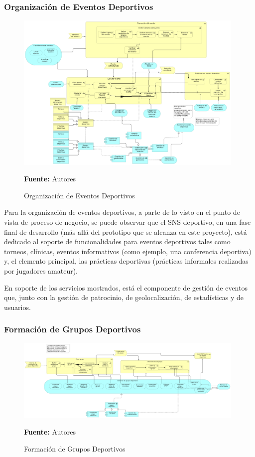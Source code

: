 \subsubsection{Organización de Eventos Deportivos}

\begin{figure}[!htb]
  \begin{center}
    \includegraphics[width=11cm]{./imagenes/application_usage/organizacioneventosdeportivos.png}
    \caption{Organización de Eventos Deportivos}
    \label{fig:au_organizacion_eventos_deportivos}
    \textbf{Fuente:}  Autores
  \end{center}
\end{figure}

Para la organización de eventos deportivos, a parte de lo visto en el punto de vista de proceso de negocio, se puede observar que el SNS deportivo, en una fase final de desarrollo (más allá del prototipo que se alcanza en este proyecto), está dedicado al soporte de funcionalidades para eventos deportivos tales como torneos, clínicas, eventos informativos (como ejemplo, una conferencia deportiva) y, el elemento principal, las prácticas deportivas (prácticas informales realizadas por jugadores amateur).

En soporte de los servicios mostrados, está el componente de gestión de eventos que, junto con la gestión de patrocinio, de geolocalización, de estadísticas y de usuarios.

\subsubsection{Formación de Grupos Deportivos}

\begin{figure}[!htb]
  \begin{center}
    \includegraphics[width=11cm]{./imagenes/application_usage/formaciongruposdeportivos.png}
    \caption{Formación de Grupos Deportivos}
    \label{fig:au_formacion_grupos_deportivos}
    \textbf{Fuente:}  Autores
  \end{center}
\end{figure}

